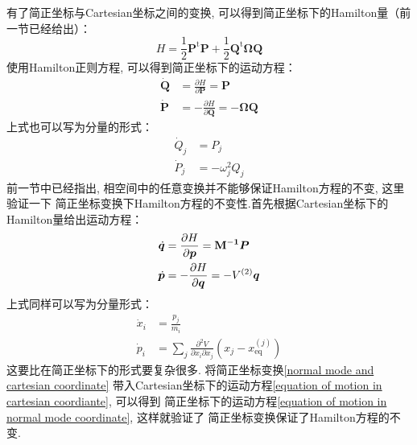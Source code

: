     \splitline

    有了简正坐标与Cartesian坐标之间的变换, 可以得到简正坐标下的Hamilton量（前一节已经给出）：
    \begin{equation}
        H = \frac 12 \bm{P}^\mathrm{t}\bm{P} + \frac 12 \bm{Q}^\mathrm{t} \bm{\Omega Q}
    \end{equation}
    使用Hamilton正则方程, 可以得到简正坐标下的运动方程：
    \begin{equation}
        \begin{aligned}
            \bm{\dot{Q}} &= \frac {\partial H}{\partial \bm{P}} = \bm{P}\\
            \bm{\dot{P}} &= -\frac {\partial H}{\partial \bm{Q}} = -\bm{\Omega Q}
        \end{aligned}
        \label{equation of motion in normal mode coordinate}
    \end{equation}
    上式也可以写为分量的形式：
    \begin{equation}
        \begin{aligned}
            \dot{Q}_j &= P_j\\
            \dot{P}_j &= - \omega_j^2 Q_j
        \end{aligned}
    \end{equation}
    前一节中已经指出, 相空间中的任意变换并不能够保证Hamilton方程的不变, 这里验证一下
    简正坐标变换下Hamilton方程的不变性.首先根据Cartesian坐标下的Hamilton量给出运动方程：
    \begin{equation}
        \begin{split}
            \dot{\bm{q}} &= \frac{\partial{H}}{\partial{\bm{p}}} = \mathbf{M^{-1}}\bm{P}\\
            \dot{\bm{p}} &= -\frac{\partial{H}}{\partial{\bm{q}}} = -V^{(2)}\bm{q}
        \end{split}
        \label{equation of motion in cartesian coordiante}
    \end{equation}
    上式同样可以写为分量形式：
    \begin{equation}
        \begin{aligned}
            \dot{x}_i &= \frac {p_j}{m_i}\\
            \dot{p}_i &= \sum_j \frac {\partial^2 V}{\partial x_i \partial x_j} (x_j - x_\mathrm{eq}^{(j)})
        \end{aligned}
    \end{equation}
    这要比在简正坐标下的形式要复杂很多.
    将简正坐标变换\ref{normal mode and cartesian coordinate}
    带入Cartesian坐标下的运动方程\ref{equation of motion in cartesian coordiante}, 可以得到
    简正坐标下的运动方程\ref{equation of motion in normal mode coordinate}, 这样就验证了
    简正坐标变换保证了Hamilton方程的不变.

